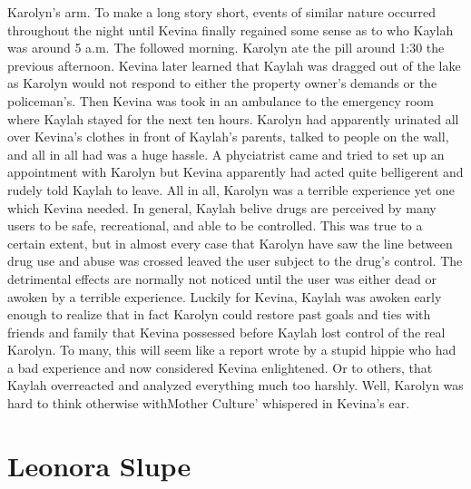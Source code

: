 \documentclass[12pt]{book}
\begin{document}
Karolyn's arm. To make a long story short, events of similar nature occurred throughout the night until Kevina finally regained some sense as to who Kaylah was around 5 a.m. The followed morning. Karolyn ate the pill around 1:30 the previous afternoon. Kevina later learned that Kaylah was dragged out of the lake as Karolyn would not respond to either the property owner's demands or the policeman's. Then Kevina was took in an ambulance to the emergency room where Kaylah stayed for the next ten hours. Karolyn had apparently urinated all over Kevina's clothes in front of Kaylah's parents, talked to people on the wall, and all in all had was a huge hassle. A phyciatrist came and tried to set up an appointment with Karolyn but Kevina apparently had acted quite belligerent and rudely told Kaylah to leave. All in all, Karolyn was a terrible experience yet one which Kevina needed. In general, Kaylah belive drugs are perceived by many users to be safe, recreational, and able to be controlled. This was true to a certain extent, but in almost every case that Karolyn have saw the line between drug use and abuse was crossed leaved the user subject to the drug's control. The detrimental effects are normally not noticed until the user was either dead or awoken by a terrible experience. Luckily for Kevina, Kaylah was awoken early enough to realize that in fact Karolyn could restore past goals and ties with friends and family that Kevina possessed before Kaylah lost control of the real Karolyn. To many, this will seem like a report wrote by a stupid hippie who had a bad experience and now considered Kevina enlightened. Or to others, that Kaylah overreacted and analyzed everything much too harshly. Well, Karolyn was hard to think otherwise withMother Culture' whispered in Kevina's ear.



\chapter{Leonora Slupe}
\end{document}
